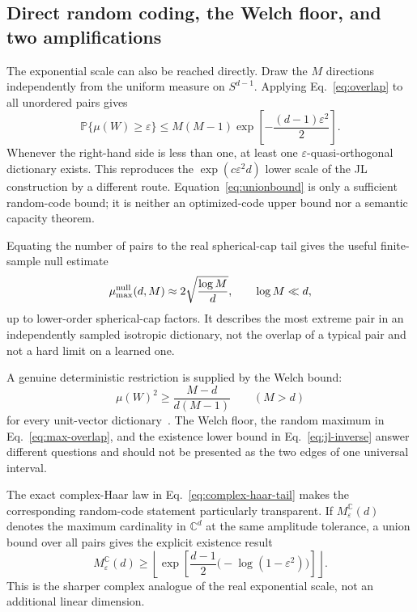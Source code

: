 \documentclass[
  aps,
  reprint,
  superscriptaddress,
  floatfix,
  nofootinbib,
  longbibliography
]{revtex4-2}
\newcommand{\Prob}{\mathbb{P}}
\newcommand{\Sph}[1]{S^{#1}}
\newcommand{\Msem}{M}
\begin{document}
\subsection{Direct random coding, the Welch floor, and two amplifications}
\label{sec:quasiortho}

The exponential scale can also be reached directly.  Draw the $\Msem$
directions independently from the uniform measure on $\Sph{d-1}$.  Applying
Eq.~\eqref{eq:overlap} to all unordered pairs gives
\begin{equation}
\label{eq:unionbound}
\Prob\{\mu(W)\geq\varepsilon\}
\leq
\Msem(\Msem-1)
\exp\!\left[-\frac{(d-1)\varepsilon^2}{2}\right].
\end{equation}
Whenever the right-hand side is less than one, at least one
$\varepsilon$-quasi-orthogonal dictionary exists.  This reproduces the
$\exp(c\varepsilon^2d)$ lower scale of the JL construction by a different
route.  Equation~\eqref{eq:unionbound} is only a sufficient random-code
bound; it is neither an optimized-code upper bound nor a semantic capacity
theorem.

Equating the number of pairs to the real spherical-cap tail gives the useful
finite-sample null estimate
\begin{equation}
\label{eq:max-overlap}
\mu_{\max}^{\rm null}(d,\Msem)
\approx
2\sqrt{\frac{\log\Msem}{d}},
\qquad
\log\Msem\ll d,
\end{equation}
up to lower-order spherical-cap factors.  It describes the most extreme pair
in an independently sampled isotropic dictionary, not the overlap of a
typical pair and not a hard limit on a learned one.

A genuine deterministic restriction is supplied by the Welch bound:
\begin{equation}
\label{eq:welch}
\mu(W)^2
\geq
\frac{\Msem-d}{d(\Msem-1)}
\qquad(\Msem>d)
\end{equation}
for every unit-vector dictionary~\cite{welch1974coherence}.  The Welch floor,
the random maximum in Eq.~\eqref{eq:max-overlap}, and the existence lower
bound in Eq.~\eqref{eq:jl-inverse} answer different questions and should not
be presented as the two edges of one universal interval.

The exact complex-Haar law in Eq.~\eqref{eq:complex-haar-tail} makes the
corresponding random-code statement particularly transparent.  If
$M_\varepsilon^{\mathbb C}(d)$ denotes the maximum cardinality in
$\mathbb C^d$ at the same amplitude tolerance, a union bound over all pairs
gives the explicit existence result
\begin{equation}
\label{eq:complex-code}
M_\varepsilon^{\mathbb C}(d)
\geq
\left\lfloor
\exp\!\left[
\frac{d-1}{2}\bigl(-\log(1-\varepsilon^2)\bigr)
\right]
\right\rfloor .
\end{equation}
This is the sharper complex analogue of the real exponential scale, not an
additional linear dimension.
\end{document}
